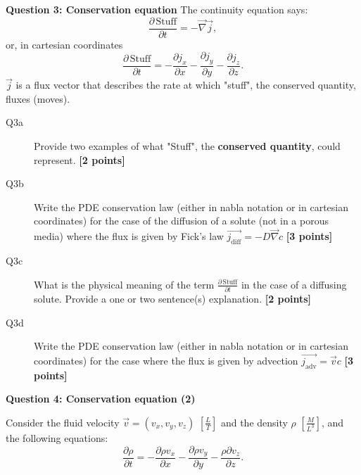 \documentclass{article}
\begin{document}
\textbf{Question 3: Conservation equation}
The continuity equation says:
\begin{equation}
\frac{\partial \, \mathrm{Stuff}}{\partial t} = - \overrightarrow{\nabla }\overrightarrow{j},
\end{equation} or, in cartesian coordinates
\begin{equation}
\frac{\partial \, \mathrm{Stuff}}{\partial t} = - \frac{\partial j_x}{\partial x} - \frac{\partial j_y}{\partial y} - \frac{\partial j_z}{\partial z}.
\end{equation} $ \overrightarrow{j} $ is a flux vector that describes the rate at which "stuff", the conserved quantity, fluxes (moves).


\begin{description}
\item [Q3a] Provide two examples of what "Stuff", the \textbf{conserved quantity}, could represent. \textbf{[2 points]}
\vspace{2cm}

\item [Q3b] Write the PDE conservation law (either in nabla notation or in cartesian coordinates) for the case of the diffusion of a solute (not in a porous media) where the flux is given by Fick's law $ \overrightarrow{j_{\mathrm{diff}}} = - D \overrightarrow{\nabla} c$ \textbf{[3 points]}
\vspace{2cm}


\item [Q3c] What is the physical meaning of the term $\frac{\partial \, \mathrm{Stuff}}{\partial t}$ in the case of a diffusing solute. Provide a one or two sentence(s) explanation. \textbf{[2 points]}
\vspace{2cm}

\item [Q3d] Write the PDE conservation law (either in nabla notation or in cartesian coordinates) for the case where the flux is given by advection $ \overrightarrow{j_{\mathrm{adv}}} = \overrightarrow{v} c$ \textbf{[3 points]}
\vspace{2cm}

\end{description}

\textbf{Question 4: Conservation equation (2)}

Consider the fluid velocity $ \overrightarrow{v} = \left(v_x,v_y,v_z   \right)$ $\left[\frac{L}{T}\right]$ and the density $\rho$ $\left[\frac{M}{L^3}\right]$, and the following equations:
\begin{equation}
\frac{\partial \rho}{\partial t} = - \frac{\partial \rho v_x}{\partial x} - \frac{\partial \rho v_y}{\partial y} - \frac{\rho \partial v_z}{\partial z}.
\end{equation}
\end{document}
